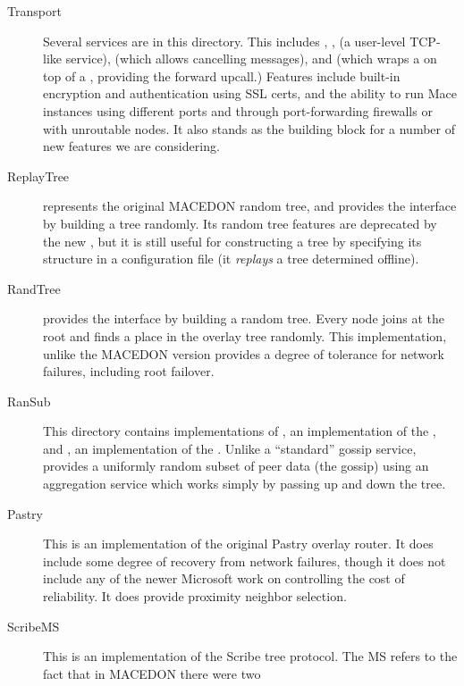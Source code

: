 \begin{description}
\item[Transport] Several  services are
  in this directory.  This includes ,
  ,  (a user-level
  TCP-like service),  (which allows
  cancelling messages), and  (which
  wraps a  on top of a
  , providing the forward upcall.)
  Features include built-in encryption and authentication using SSL
  certs, and the ability to run Mace instances using different ports and
  through port-forwarding firewalls or with unroutable nodes.  It also
  stands as the building block for a number of new features we are
  considering.
\item[ReplayTree]  represents the original MACEDON random tree,
  and provides the  interface by building a tree 
  randomly.  Its random tree features are deprecated by the new ,
  but it is still useful for constructing a tree by specifying its structure in
  a configuration file (it \emph{replays} a tree determined offline).
\item[RandTree]  provides the 
  interface by building a random tree.  Every node joins at the root and finds
  a place in the overlay tree randomly.  This implementation, unlike the MACEDON
  version provides a degree of tolerance for network failures, including root
  failover.
\item[RanSub] This directory contains implementations of ,
  an implementation of the , and
  , an implementation of the .
  Unlike a ``standard'' gossip service,  provides a uniformly
  random subset of peer data (the gossip) using an aggregation service which
  works simply by passing up and down the tree.
\item[Pastry] This is an implementation of the original Pastry overlay router.
  It does include some degree of recovery from network failures, though it does 
  not include any of the newer Microsoft work on controlling the cost of 
  reliability.  It does provide proximity neighbor selection.
\item[ScribeMS] This is an implementation of the Scribe tree 
  protocol.  The MS refers to the fact that in MACEDON there were two

\end{description}
